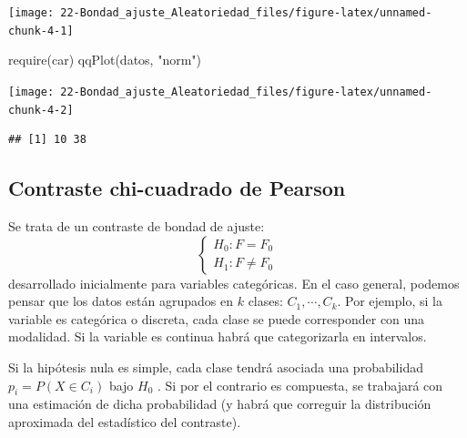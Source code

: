 \documentclass[
]{book}
\newenvironment{Shaded}{\begin{snugshade}}{\end{snugshade}}
\newcommand{\FunctionTok}[1]{\textcolor[rgb]{0.00,0.00,0.00}{#1}}
\newcommand{\NormalTok}[1]{#1}
\newcommand{\StringTok}[1]{\textcolor[rgb]{0.31,0.60,0.02}{#1}}
\theoremstyle{break}
\theoremstyle{nonumberplain}
\begin{document}
\begin{center}\texttt{[image: 22-Bondad\_ajuste\_Aleatoriedad\_files/figure-latex/unnamed-chunk-4-1]} \end{center}

\begin{Shaded}
\begin{Highlighting}[]
\FunctionTok{require}\NormalTok{(car)}
\FunctionTok{qqPlot}\NormalTok{(datos, }\StringTok{"norm"}\NormalTok{)}
\end{Highlighting}
\end{Shaded}

\begin{center}\texttt{[image: 22-Bondad\_ajuste\_Aleatoriedad\_files/figure-latex/unnamed-chunk-4-2]} \end{center}

\begin{verbatim}
## [1] 10 38
\end{verbatim}

\hypertarget{chi2test}{%
\subsection{Contraste chi-cuadrado de Pearson}\label{chi2test}}

Se trata de un contraste de bondad de ajuste:
\[\left \{
\begin{array}{l}
H_0:F=F_0\\
H_1:F\neq F_0\end{array}
\right.\]
desarrollado inicialmente para variables categóricas. En el caso general, podemos pensar que los datos están agrupados en \(k\) clases: \(C_1,\cdots,C_{k}\). Por ejemplo, si la variable es categórica o discreta, cada clase se puede corresponder con una modalidad. Si la variable es continua habrá que categorizarla en intervalos.

Si la hipótesis nula es simple, cada clase tendrá asociada una probabilidad \(p_{i}=P\left( X\in C_{i} \right)\) bajo \(H_0\) . Si por el contrario es compuesta, se trabajará con una estimación de dicha probabilidad (y habrá que correguir la distribución aproximada del estadístico del contraste).
\end{document}

